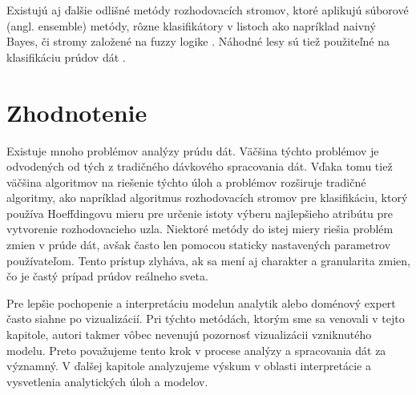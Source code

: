 \par
Existujú aj ďalšie odlišné metódy rozhodovacích stromov, ktoré aplikujú súborové (angl. ensemble) metódy, rôzne klasifikátory v listoch ako napríklad naivný Bayes, či stromy založené na fuzzy logike \citep{aggarwal2014survey}. Náhodné lesy sú tiež použiteľné na klasifikáciu prúdov dát \citep{abdulsalam2007streaming, abdulsalam2011classification}.

\section{Zhodnotenie}
Existuje mnoho problémov analýzy prúdu dát. Väčšina týchto problémov je odvodených od tých z tradičného dávkového spracovania dát. Vďaka tomu tiež väčšina algoritmov na riešenie týchto úloh a problémov rozširuje tradičné algoritmy, ako napríklad algoritmus rozhodovacích stromov pre klasifikáciu, ktorý používa Hoeffdingovu mieru pre určenie istoty výberu najlepšieho atribútu pre vytvorenie rozhodovacieho uzla. Niektoré metódy do istej miery riešia problém zmien v prúde dát, avšak často len pomocou staticky nastavených parametrov používateľom. Tento prístup zlyháva, ak sa mení aj charakter a granularita zmien, čo je častý prípad prúdov reálneho sveta.
\par
Pre lepšie pochopenie a interpretáciu modelun analytik alebo doménový expert často siahne po vizualizácií. Pri týchto metódách, ktorým sme sa venovali v tejto kapitole, autori takmer vôbec nevenujú pozornosť vizualizácii vzniknutého modelu. Preto považujeme tento krok v procese analýzy a spracovania dát za významný. V ďalšej kapitole analyzujeme výskum v oblasti interpretácie a vysvetlenia analytických úloh a modelov.


